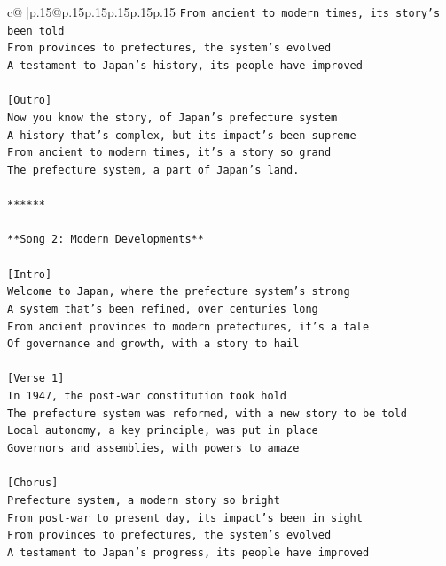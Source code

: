 \documentclass{article}
\begin{document}
{\begin{supertabular}{c@{$\;$}|p{.15\linewidth}@{}p{.15\linewidth}p{.15\linewidth}p{.15\linewidth}p{.15\linewidth}p{.15\linewidth}}
{{{\texttt{From ancient to modern times, its story's been told} \\
\texttt{From provinces to prefectures, the system's evolved} \\
\texttt{A testament to Japan's history, its people have improved} \\
\\ 
\texttt{{[}Outro{]}} \\
\texttt{Now you know the story, of Japan's prefecture system} \\
\texttt{A history that's complex, but its impact's been supreme} \\
\texttt{From ancient to modern times, it's a story so grand} \\
\texttt{The prefecture system, a part of Japan's land.} \\
\\ 
\texttt{******} \\
\\ 
\texttt{**Song 2: Modern Developments**} \\
\\ 
\texttt{{[}Intro{]}} \\
\texttt{Welcome to Japan, where the prefecture system's strong} \\
\texttt{A system that's been refined, over centuries long} \\
\texttt{From ancient provinces to modern prefectures, it's a tale} \\
\texttt{Of governance and growth, with a story to hail} \\
\\ 
\texttt{{[}Verse 1{]}} \\
\texttt{In 1947, the post{-}war constitution took hold} \\
\texttt{The prefecture system was reformed, with a new story to be told} \\
\texttt{Local autonomy, a key principle, was put in place} \\
\texttt{Governors and assemblies, with powers to amaze} \\
\\ 
\texttt{{[}Chorus{]}} \\
\texttt{Prefecture system, a modern story so bright} \\
\texttt{From post{-}war to present day, its impact's been in sight} \\
\texttt{From provinces to prefectures, the system's evolved} \\
\texttt{A testament to Japan's progress, its people have improved} \\
}}}
\end{supertabular}}
\end{document}
